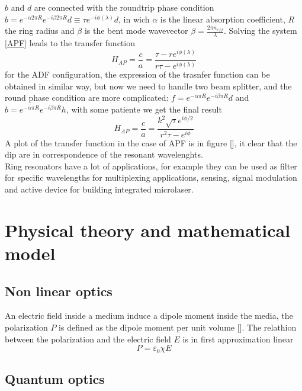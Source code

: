 \documentclass[10pt]{book}
\begin{document}
$b$ and $d$ are connected with the roundtrip phase condition $b = e^{-\alpha 2\pi R} e^{-i\beta 2\pi R}d \equiv\tau e^{-i\phi(\lambda)}d $, in wich $\alpha$ is the linear absorption coefficient, $R$ the ring radius and $\beta$ is the bent mode wavevector $\beta = \frac{2\pi n_{eff}}{\lambda}$. Solving the system \eqref{APF} leads to the transfer function
\[H_{AP} = \frac{c}{a} = \frac{\tau - re^{i\phi(\lambda)}}{r\tau -e^{i\phi(\lambda)}}\]
for the ADF configuration, the expression of the trasnfer function can be obtained in similar way, but now we need to handle two beam splitter, and the round phase condition are more complicated: $f = e^{-\alpha \pi R} e^{-i\beta \pi R}d$ and $b=e^{-\alpha \pi R} e^{-i\beta \pi R}h$, with some patiente we get the final result
\[H_{AP} = \frac{c}{a} = \frac{k^2\sqrt{\tau} e^{i\phi/2}}{r^2\tau -e^{i\phi}}\]
A plot of the transfer function in the case of APF is in figure [], it clear that the dip are in correspondence of the resonant wavelenghts.\\
Ring resonators have a lot of applications, for example they can be used as filter for specific wavelengths for multiplexing applications, sensing, signal modulation and active device for building integrated microlaser.  



\chapter{Physical theory and mathematical model}
\section{Non linear optics}
An electric field inside a medium induce a dipole moment inside the media, the polarization $P$ is defined as the dipole moment per unit volume []. The relathion between the polarization and the electric field $E$ is in first approximation linear
\[P = \varepsilon_0 \chi E\]
\section{Quantum optics}
\end{document}
